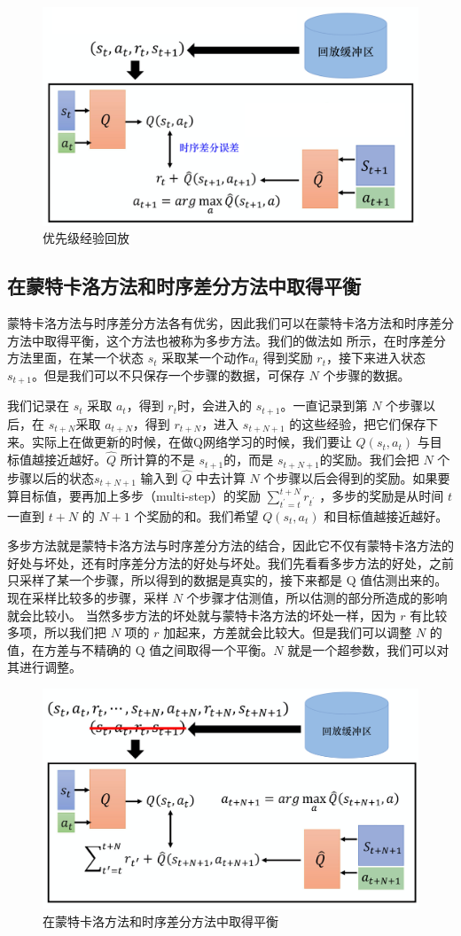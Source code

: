 \begin{figure}[htb]
    \centering
    \includegraphics[width=0.5\linewidth]{res/ch7/7.7}
    \caption{优先级经验回放}
    \label{fig:PER}
\end{figure}

\subsection{在蒙特卡洛方法和时序差分方法中取得平衡} 
蒙特卡洛方法与时序差分方法各有优劣，因此我们可以在蒙特卡洛方法和时序差分方法中取得平衡，这个方法也被称为多步方法。我们的做法如 所示，在时序差分方法里面，在某一个状态 $s_t$ 采取某一个动作$a_t$ 得到奖励 $r_t$，接下来进入状态 $s_{t+1}$。但是我们可以不只保存一个步骤的数据，可保存 $N$ 个步骤的数据。

我们记录在 $s_t$ 采取 $a_t$，得到 $r_t$时，会进入的 $s_{t+1}$。一直记录到第 $N$ 个步骤以后，在 $s_{t+N}$采取 $a_{t+N}$，得到 $r_{t+N}$，进入 $s_{t+N+1}$ 的这些经验，把它们保存下来。实际上在做更新的时候，在做Q网络学习的时候，我们要让 $Q(s_t,a_t)$ 与目标值越接近越好。$\hat{Q}$ 所计算的不是 $s_{t+1}$的，而是 $s_{t+N+1}$的奖励。我们会把 $N$ 个步骤以后的状态$s_{t+N+1}$ 输入到 $\hat{Q}$ 中去计算 $N$ 个步骤以后会得到的奖励。如果要算目标值，要再加上多步（multi-step）的奖励 $\sum_{t^{\prime}=t}^{t+N} r_{t^{\prime}}$ ，多步的奖励是从时间 $t$ 一直到 $t+N$ 的 $N+1$ 个奖励的和。我们希望 $Q(s_t,a_t)$ 和目标值越接近越好。

多步方法就是蒙特卡洛方法与时序差分方法的结合，因此它不仅有蒙特卡洛方法的好处与坏处，还有时序差分方法的好处与坏处。我们先看看多步方法的好处，之前只采样了某一个步骤，所以得到的数据是真实的，接下来都是 Q 值估测出来的。现在采样比较多的步骤，采样 $N$ 个步骤才估测值，所以估测的部分所造成的影响就会比较小。
当然多步方法的坏处就与蒙特卡洛方法的坏处一样，因为 $r$ 有比较多项，所以我们把 $N$ 项的 $r$ 加起来，方差就会比较大。但是我们可以调整 $N$ 的值，在方差与不精确的 Q 值之间取得一个平衡。$N$ 就是一个超参数，我们可以对其进行调整。

\begin{figure}[htb]
    \centering
    \includegraphics[width=0.5\linewidth]{res/ch7/7.8}
    \caption{在蒙特卡洛方法和时序差分方法中取得平衡}
    \label{fig:balance_MC_TD}
\end{figure}

